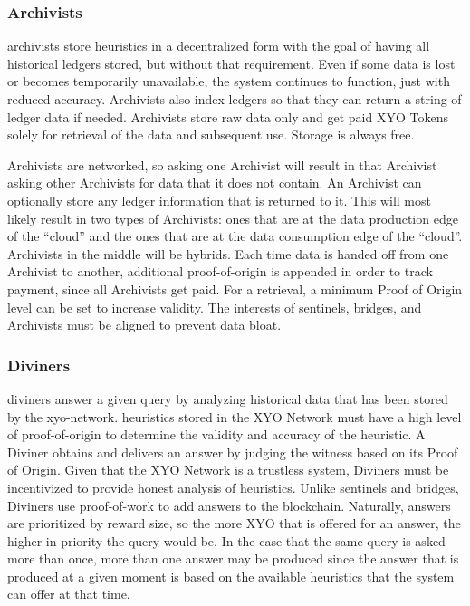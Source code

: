 \documentclass{article}
\begin{document}
\subsubsection {Archivists}
\Glspl{archivist} store \glspl{heuristic} in a decentralized form with the goal of having all historical ledgers stored, but without that requirement. Even if some data is lost or becomes temporarily unavailable, the system continues to function, just with reduced \gls{accuracy}. Archivists also index ledgers so that they can return a string of ledger data if needed. Archivists store raw data only and get paid XYO Tokens solely for retrieval of the data and subsequent use. Storage is always free.

Archivists are networked, so asking one Archivist will result in that Archivist asking other Archivists for data that it does not contain. An Archivist can optionally store any ledger information that is returned to it. This will most likely result in two types of Archivists: ones that are at the data production edge of the ``cloud'' and the ones that are at the data consumption edge of the ``cloud''. Archivists in the middle will be hybrids. Each time data is handed off from one Archivist to another, additional \Gls{proof-of-origin} is appended in order to track payment, since all Archivists get paid. For a retrieval, a minimum Proof of Origin level can be set to increase validity. The interests of \Glspl{sentinel}, \Glspl{bridge}, and Archivists must be aligned to prevent data bloat.

\subsubsection {Diviners}
\Glspl{diviner} answer a given query by analyzing historical data that has been stored by the \Gls{xyo-network}. \Glspl{heuristic} stored in the XYO Network must have a high level of \Gls{proof-of-origin} to determine the validity and \gls{accuracy} of the heuristic. A Diviner obtains and delivers an answer by judging the witness based on its Proof of Origin. Given that the XYO Network is a trustless system, Diviners must be incentivized to provide honest analysis of heuristics. Unlike \Glspl{sentinel} and \Glspl{bridge}, Diviners use \Gls{proof-of-work} to add answers to the blockchain. Naturally, answers are prioritized by reward size, so the more XYO that is offered for an answer, the higher in priority the query would be. In the case that the same query is asked more than once, more than one answer may be produced since the answer that is produced at a given moment is based on the available heuristics that the system can offer at that time.
\end{document}
